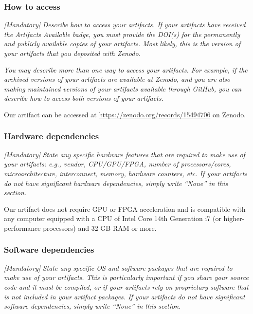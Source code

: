 \documentclass[sigconf]{acmart}
\begin{document}

\subsubsection{How to access}

\emph{[Mandatory]}
%
\emph{Describe how to access your artifacts.  If your artifacts have
received the \emph{Artifacts Available} badge, you must provide the
DOI(s) for the permanently and publicly available copies of your
artifacts.  Most likely, this is the version of your artifacts that
you deposited with Zenodo.}

\emph{You may describe more than one way to access your artifacts.
For example, if the archived versions of your artifacts are available
at Zenodo, and you are also making maintained versions of your
artifacts available through GitHub, you can describe how to access
both versions of your artifacts.}

Our artifact can be accessed at \url{https://zenodo.org/records/15494706} on Zenodo.

\subsubsection{Hardware dependencies}

\emph{[Mandatory]}
%
\emph{State any specific hardware features that are required to make
use of your artifacts: e.g., vendor, CPU/GPU/FPGA, number of
processors/cores, microarchitecture, interconnect, memory, hardware
counters, etc.  If your artifacts do not have significant hardware
dependencies, simply write ``None'' in this section.}

Our artifact does not require GPU or FPGA acceleration and is compatible with any computer equipped with a CPU of Intel Core 14th Generation i7 (or higher-performance processors) and 32 GB RAM or more.

\subsubsection{Software dependencies}

\emph{[Mandatory]}
%
\emph{State any specific OS and software packages that are required to
make use of your artifacts.  This is particularly important if you
share your source code and it must be compiled, or if your artifacts
rely on proprietary software that is not included in your artifact
packages.  If your artifacts do not have significant software
dependencies, simply write ``None'' in this section.}
\end{document}

